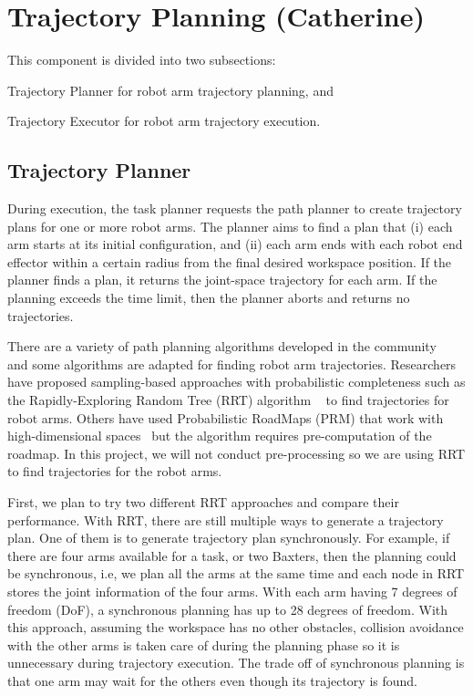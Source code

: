 \section{Trajectory Planning (Catherine)}

This component is divided into two subsections:
\begin{enumerate*}[label=\thesection.\arabic*]
\item Trajectory Planner for robot arm trajectory planning, and
\item Trajectory Executor for robot arm trajectory execution.
\end{enumerate*}

\subsection{Trajectory Planner}

During execution, the task planner requests the path planner to create trajectory plans for one or more robot arms. The planner aims to find a plan that (i) each arm starts at its initial configuration, and (ii) each arm ends with each robot end effector within a certain radius from the final desired workspace position. If the planner finds a plan, it returns the joint-space trajectory for each arm. If the planning exceeds the time limit, then the planner aborts and returns no trajectories. 

There are a variety of path planning algorithms developed in the community~\cite{DBLP:books/daglib/0016830} and some algorithms are adapted for finding robot arm trajectories. 
Researchers have proposed sampling-based approaches with probabilistic completeness such as the Rapidly-Exploring Random Tree (RRT) algorithm ~\cite{VahrenkampBAKD09} to find trajectories for robot arms. Others have used Probabilistic RoadMaps (PRM) that work with high-dimensional spaces~\cite{KavrakiSLO96} but the algorithm requires pre-computation of the roadmap. In this project, we will not conduct pre-processing so we are using RRT to find trajectories for the robot arms.

First, we plan to try two different RRT approaches and compare their performance. With RRT, there are still multiple ways to generate a trajectory plan.
One of them is to generate trajectory plan synchronously.
For example, if there are four arms available for a task, or two Baxters, then the planning could be synchronous, i.e, we plan all the arms at the same time and each node in RRT stores the joint information of the four arms. With each arm having 7 degrees of freedom (DoF), a synchronous planning has up to 28 degrees of freedom.
With this approach, assuming the workspace has no other obstacles, collision avoidance with the other arms is taken care of during the planning phase so it is unnecessary during trajectory execution.  
The trade off of synchronous planning is that one arm may wait for the others even though its trajectory is found.

